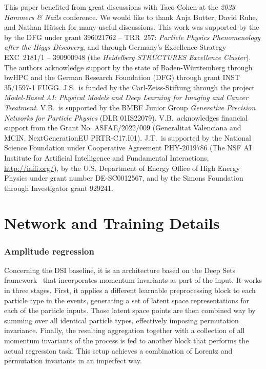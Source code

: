 \documentclass[submission, Phys]{SciPost}
\begin{document}
This paper benefited from great discussions with Taco Cohen at the \textsl{2023 Hammers \& Nails} conference.
We would like to thank Anja Butter, David Ruhe, and Nathan H\"utsch for many useful discussions.
This work was supported by the by the DFG under grant 396021762 -- TRR~257: \textsl{Particle Physics Phenomenology after the   Higgs Discovery}, and through Germany's Excellence Strategy EXC~2181/1 -- 390900948 (the \textsl{Heidelberg STRUCTURES Excellence Cluster}). The authors acknowledge support by the state of Baden-Württemberg through bwHPC
and the German Research Foundation (DFG) through grant INST 35/1597-1 FUGG.
J.S.\ is funded by the Carl-Zeiss-Stiftung through the project \textsl{Model-Based AI: Physical Models and Deep Learning for Imaging and Cancer Treatment}.
V.B.\ is supported by the BMBF Junior Group \textsl{Generative Precision Networks for Particle Physics} (DLR 01IS22079). V.B.\ acknowledges financial support from the Grant No. ASFAE/2022/009 (Generalitat Valenciana and MCIN, NextGenerationEU PRTR-C17.I01).
J.T.\ is supported by the National Science Foundation under Cooperative Agreement PHY-2019786 (The NSF AI Institute for Artificial Intelligence and Fundamental Interactions, \url{http://iaifi.org/}), by the U.S. Department of Energy Office of High Energy Physics under grant number DE-SC0012567, and by the Simons Foundation through Investigator grant 929241.


%


\appendix
\section{Network and Training Details}
\label{app:hyperparams}

\subsubsection*{Amplitude regression}

Concerning the DSI baseline, it is an architecture based on the Deep Sets framework~\cite{zaheer2017deep} that incorporates momentum invariants as part of the input. It works in three stages. First, it applies a different learnable preprocessing block to each particle type in the events, generating a set of latent space representations for each of the particle inputs. Those latent space points are then combined way by summing over all identical particle types, effectively imposing permutation invariance. Finally, the resulting aggregation together with a collection of all momentum invariants of the process is fed to another block that performs the actual regression task. This setup achieves a combination of Lorentz and permutation invariants in an imperfect way.
\end{document}
